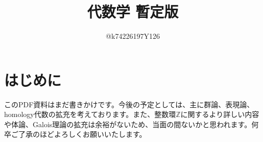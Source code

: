 \documentclass[10pt,a4paper,titlepage]{jsarticle}
\title{代数学 暫定版}
\author{@k74226197Y126}
\begin{document}
\maketitle
{}
\section*{はじめに}
\par
このPDF資料はまだ書きかけです。今後の予定としては、主に群論、表現論、homology代数の拡充を考えております。また、整数環$\mathbb{Z}$に関するより詳しい内容や体論、Galois理論の拡充は余裕がないため、当面の間ないかと思われます。何卒ご了承のほどよろしくお願いいたします。
\tableofcontents
\clearpage
{}


\clearpage

\clearpage

\clearpage

\clearpage

\clearpage
\setcounter{section}{2}


\clearpage

\clearpage

\clearpage

\clearpage

\clearpage

\clearpage

\end{document}
